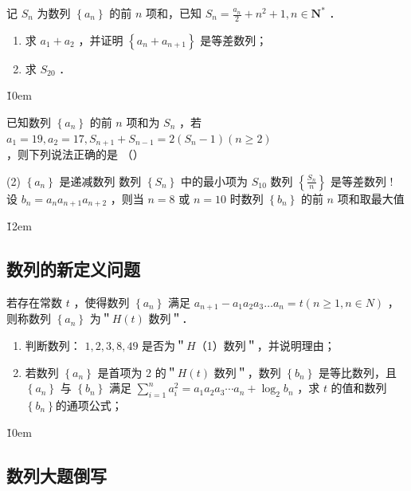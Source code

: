 \begin{example}
    记 $S_n$ 为数列 $\left\{a_n\right\}$ 的前 $n$ 项和，已知 $S_n=\frac{a_n}{2}+n^2+1, n \in \mathbf{N}^*$ ．
    \begin{enumerate}
        \item 求 $a_1+a_2$ ，并证明 $\left\{a_n+a_{n+1}\right\}$ 是等差数列；
        \item 求 $S_{20}$ ．
    \end{enumerate}
\end{example}

\v{10em}

\begin{example}
    已知数列 $\left\{a_n\right\}$ 的前 $n$ 项和为 $S_n$ ，若 $a_1=19, a_2=17, S_{n+1}+S_{n-1}=2\left(S_n-1\right)(n \geq 2)$ ，则下列说法正确的是 （\qquad）
    \begin{tasks}(2)
        \task $\left\{a_n\right\}$ 是递减数列
        \task 数列 $\left\{S_n\right\}$ 中的最小项为 $S_{10}$
        \task 数列 $\left\{\frac{S_n}{n}\right\}$ 是等差数列
        \task! 设 $b_n=a_n a_{n+1} a_{n+2}$ ，则当 $n=8$ 或 $n=10$ 时数列 $\left\{b_n\right\}$ 的前 $n$ 项和取最大值
    \end{tasks}
\end{example}

\v{12em}

\subsection{数列的新定义问题}

\begin{example}
    若存在常数 $t$ ，使得数列 $\left\{a_n\right\}$ 满足
    $a_{n+1}-a_1 a_2 a_3 \ldots a_n=t(n \geqslant 1, n \in N)$ ，则称数列 $\left\{a_n\right\}$ 为＂$H(t)$ 数列＂．
    \begin{enumerate}
        \item 判断数列： $1,2,3,8,49$ 是否为＂$H$（1）数列＂，并说明理由；
        \item 若数列 $\left\{a_n\right\}$ 是首项为 2 的＂$H(t)$ 数列＂，数列 $\left\{b_n\right\}$ 是等比数列，且 $\left\{a_n\right\}$ 与 $\left\{b_n\right\}$ 满足 $\sum_{i=1}^n a_i^2=a_1 a_2 a_3 \cdots a_n+\log _2 b_n$ ，求 $t$ 的值和数列 $\left\{b_n\right\}$的通项公式；
    \end{enumerate}
\end{example}

\v{10em}

\subsection{数列大题倒写}

